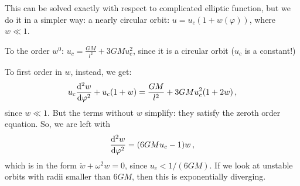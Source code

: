 \documentclass[main.tex]{subfiles}
\begin{document}
This can be solved exactly with respect to complicated elliptic function, but we do it in a simpler way: a nearly circular orbit: \(u = u_c (1+w(\varphi ))\), where \(w \ll 1\).

To the order \(w^{0}\): \(u_c = \frac{GM}{l^2} + 3GM u_c^{2}\), since it is a circular orbit (\(u_c\) is a constant!)

To first order in \(w\), instead, we get: 
%
\begin{align}
  u_c \dv[2]{w}{\varphi } + u_c(1+w) = \frac{GM}{l^2} + 3GMu_c^2 (1+2w)
\,,
\end{align}
%
since \(w \ll 1\). But the terms without \(w\) simplify: they satisfy the zeroth order equation. So, we are left with 
%
\begin{align}
  \dv[2]{w}{\varphi }  = (6GMu_c-1) w
\,,
\end{align}
%
which is in the form \(\ddot{w} + \omega^2 w =0\), since \(u_c < 1/(6GM)\). If we look at unstable orbits with radii smaller than \(6GM\), then this is exponentially diverging.
\end{document}
